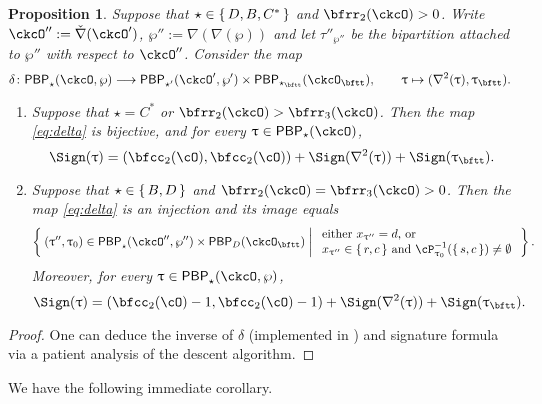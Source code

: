 \documentclass[12pt,a4paper]{amsart}
\def\tauwppp{\tau''_{\wp''}}
\def\ckDD{{\check\DD}}
\def\DD{\nabla}
\numberwithin{equation}{section}
\newtheorem{prop}[thm]{Proposition}
\theoremstyle{remark}
\def\DD{\nabla}
\def\PBP{\mathsf{PBP}}
\def\ckcOpp{\ckcO''}
\def\PBPop#1#2#3#4{\PBP_{#1}^{#2}(#3,#4)}
\newcommand{\PBPOP}[1][]{\PBPop{\star}{#1}{\ckcO}{\wp}}
\def\PBPOPp{\PBPop{\star'}{}{\ckcO'}{\wp'}}
\newcommand{\PBPOPpp}[1][]{\PBPop{\star}{#1}{\ckcO''}{\wp''}}
\begin{document}
\begin{prop}
\label{lem:delta}
Suppose that $\star \in \set{D,B,C^*}$ and $\bfrr_2(\ckcO)>0$. Write
$\ckcOpp := \ckDD(\ckcO')$, $\wp'':= \DD(\DD(\wp))$ and let $\tauwppp$ be the
bipartition attached to $\wp''$ with respect to $\ckcO''$. Consider the map
\begin{equation}\label{eq:delta}
  \delta  \colon \PBPOP \longrightarrow
    \PBPOPp \times \PBP_{\star_\bftt}(\ckcO_\bftt),
    \qquad \uptau \mapsto (\DD^2(\uptau),\uptau_\bftt).
\end{equation}
\begin{enumerate}[label=(\alph*)]
\item Suppose that
$\star = C^*$ or $\bfrr_2(\ckcO)>\bfrr_3(\ckcO)$. Then the map \eqref{eq:delta} is bijective, and for every $\uptau\in  \PBP_\star(\ckcO) $,
\begin{equation}\label{eq:sign.D}
\Sign(\uptau)
=(\bfcc_2(\cO),\bfcc_2(\cO))+\Sign(\DD^2(\uptau))+\Sign(\uptau_\bftt).
\end{equation}

\item Suppose that  $\star \in \set{B,D}$ and $\bfrr_2(\ckcO)=\bfrr_3(\ckcO)>0$.
Then the map \eqref{eq:delta} is an  injection and its  image equals
\begin{equation}\label{eq:delta.I}
    \Set{ (\uptau'',\uptau_0)  \in \PBPOPpp \times \PBP_D(\ckcO_\bftt)  |
    \begin{array}{l}
        \text{either
    $x_{\uptau''} = d$, or} \\
    \text{$x_{\uptau''}\in \set{r,c}$  and
    $\cP_{\uptau_0}^{-1}(\set{s,c})\neq \emptyset$}
    \end{array}
}.
\end{equation}
Moreover,  for every $\uptau\in  \PBPOP$,
\begin{equation}\label{eq:sign.GD}
\Sign(\uptau)
=(\bfcc_2(\cO)-1,\bfcc_2(\cO)-1)+\Sign(\DD^2(\uptau))+\Sign(\uptau_\bftt).
\end{equation}
\end{enumerate}
\end{prop}
\begin{proof}
  One can deduce the inverse of $\delta$ (implemented in \cite{MU}) and signature formula via a patient analysis %
  of the descent algorithm.
\end{proof}


We have the following immediate corollary.
\end{document}
